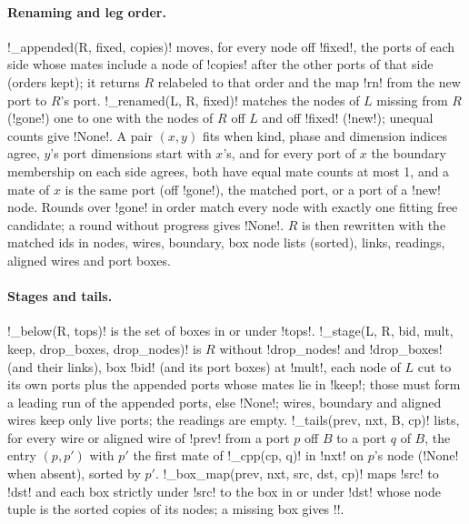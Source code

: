 {{{\paragraph{Renaming and leg order.} \lexpy!_appended(R, fixed, copies)! moves, for every node off
\lexcode!fixed!, the ports of each side whose mates include a node of \lexcode!copies! after the other
ports of that side (orders kept); it returns $R$ relabeled to that order and the map \lexcode!rn!
from the new port to $R$'s port. \lexpy!_renamed(L, R, fixed)! matches the nodes of $L$ missing from
$R$ (\lexcode!gone!) one to one with the nodes of $R$ off $L$ and off \lexcode!fixed! (\lexcode!new!);
unequal counts give \lexpy!None!. A pair $(x, y)$ fits when kind, phase and dimension indices agree,
$y$'s port dimensions start with $x$'s, and for every port of $x$ the boundary membership on
each side agrees, both have equal mate counts at most 1, and a mate of $x$ is the same port (off
\lexcode!gone!), the matched port, or a port of a \lexcode!new! node. Rounds over \lexcode!gone! in order
match every node with exactly one fitting free candidate; a round without progress gives
\lexpy!None!. $R$ is then rewritten with the matched ids in nodes, wires, boundary, box node lists
(sorted), links, readings, aligned wires and port boxes.

\paragraph{Stages and tails.} \lexpy!_below(R, tops)! is the set of boxes in or under \lexcode!tops!.
\lexpy!_stage(L, R, bid, mult, keep, drop_boxes, drop_nodes)! is $R$ without \lexcode!drop_nodes! and
\lexcode!drop_boxes! (and their links), box \lexcode!bid! (and its port boxes) at \lexcode!mult!, each node
of $L$ cut to its own ports plus the appended ports whose mates lie in \lexcode!keep!; those must
form a leading run of the appended ports, else \lexpy!None!; wires, boundary and aligned wires keep
only live ports; the readings are empty. \lexpy!_tails(prev, nxt, B, cp)! lists, for every wire or
aligned wire of \lexcode!prev! from a port $p$ off $B$ to a port $q$ of $B$, the entry $(p, p')$ with
$p'$ the first mate of \lexpy!_cpp(cp, q)! in \lexcode!nxt! on $p$'s node (\lexpy!None! when absent),
sorted by $p'$. \lexpy!_box_map(prev, nxt, src, dst, cp)! maps \lexcode!src! to \lexcode!dst! and each box
strictly under \lexcode!src! to the box in or under \lexcode!dst! whose node tuple is the sorted copies
of its nodes; a missing box gives \lexpy!{}!.

}}}
